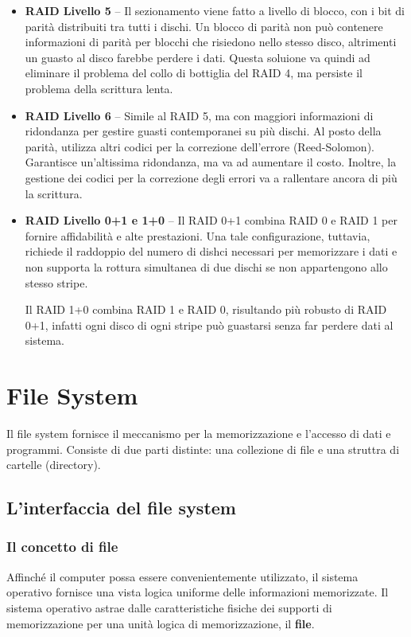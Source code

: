 \documentclass[a4]{article}
\begin{document}
\begin{itemize}
    \item \textbf{RAID Livello 5} -- Il sezionamento viene fatto a livello di blocco, con i bit di parità distribuiti tra tutti i dischi. Un blocco di parità non può contenere informazioni di parità per blocchi che risiedono nello stesso disco, altrimenti un guasto al disco farebbe perdere i dati. Questa soluione va quindi ad eliminare il problema del collo di bottiglia del RAID 4, ma persiste il problema della scrittura lenta.
    \item \textbf{RAID Livello 6} -- Simile al RAID 5, ma con maggiori informazioni di ridondanza per gestire guasti contemporanei su più dischi. Al posto della parità, utilizza altri codici per la correzione dell'errore (Reed-Solomon). Garantisce un'altissima ridondanza, ma va ad aumentare il costo. Inoltre, la gestione dei codici per la correzione degli errori va a rallentare ancora di più la scrittura.
    \item \textbf{RAID Livello 0+1 e 1+0} -- Il RAID 0+1 combina RAID 0 e RAID 1 per fornire affidabilità e alte prestazioni. Una tale configurazione, tuttavia, richiede il raddoppio del numero di dishci necessari per memorizzare i dati e non supporta la rottura simultanea di due dischi se non appartengono allo stesso stripe.

          Il RAID 1+0 combina RAID 1 e RAID 0, risultando più robusto di RAID 0+1, infatti ogni disco di ogni stripe può guastarsi senza far perdere dati al sistema.
\end{itemize}


\section{File System}
Il file system fornisce il meccanismo per la memorizzazione e l'accesso di dati e programmi. Consiste di due parti distinte: una collezione di file e una struttra di cartelle (directory).

\subsection{L'interfaccia del file system}

\subsubsection{Il concetto di file}
Affinché il computer possa essere convenientemente utilizzato, il sistema operativo fornisce una vista logica uniforme delle informazioni memorizzate. Il sistema operativo astrae dalle caratteristiche fisiche dei supporti di memorizzazione per una unità logica di memorizzazione, il \textbf{file}.
\end{document}
